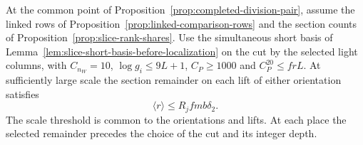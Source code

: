 \begin{proposition}
At the common point of Proposition~\ref{prop:completed-division-pair},
assume the linked rows of Proposition~\ref{prop:linked-comparison-rows}
and the section counts of Proposition~\ref{prop:slice-rank-shares}.
Use the simultaneous short basis of
Lemma~\ref{lem:slice-short-basis-before-localization} on the cut by
the selected light columns, with \(C_{n_W}=10\), \(\log g_i\le9L+1\), \(C_P\ge1000\)
and \(C_P^{20}\le frL\). At sufficiently large scale the section
remainder on each lift of either orientation satisfies
\[
                 \langle r\rangle\le R_j fmb\delta_2 .
\]
The scale threshold is common to the orientations and lifts.
At each place the selected remainder precedes the choice of the
cut and its integer depth.
\end{proposition}
